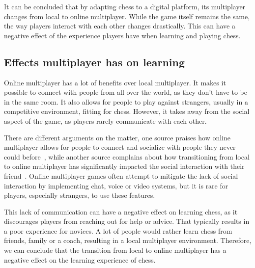 It can be concluded that by adapting chess to a digital platform, its multiplayer changes from local to online
multiplayer.
While the game itself remains the same, the way players interact with each other changes drastically.
This can have a negative effect of the experience players have when learning and playing chess.

\subsection{Effects multiplayer has on learning}\label{subsec:effects-multiplayer-has-on-learning}

Online multiplayer has a lot of benefits over local multiplayer.
It makes it possible to connect with people from all over the world, as they don't have to be in the same room.
It also allows for people to play against strangers, usually in a competitive environment, fitting for chess.
However, it takes away from the social aspect of the game, as players rarely communicate with each other.

There are different arguments on the matter, one source praises how online multiplayer allows for people to connect and
socialize with people they never could before~\cite{multiplayer-online}, while another source complains about how
transitioning from local to online multiplayer has significantly impacted the social interaction with their
friend~\cite{multiplayer-local}.
Online multiplayer games often attempt to mitigate the lack of social interaction by implementing chat, voice or video
systems, but it is rare for players, especially strangers, to use these features.

This lack of communication can have a negative effect on learning chess, as it discourages players from reaching out
for help or advice.
That typically results in a poor experience for novices.
A lot of people would rather learn chess from friends, family or a coach, resulting in a local multiplayer environment.
Therefore, we can conclude that the transition from local to online multiplayer has a negative effect on the learning
experience of chess.
